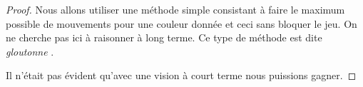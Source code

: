 \begin{proof}
	Nous allons utiliser une méthode simple consistant à faire le maximum possible de mouvements pour une couleur donnée et ceci sans bloquer le jeu. On ne cherche pas ici à raisonner à long terme. Ce type de méthode est dite \emph{\itshape \og gloutonne \fg}.

\begin{mvts}
	\medskip
	\item  {}

	\medskip
	\item  {}

	\medskip
	\item  {}

	\medskip
	\item  {}

	\medskip
	\item  {}

	\medskip
	\item  {}

	\medskip
	\item  {}

	\medskip
	\item  {}

	\medskip
	\item  {}
\end{mvts}

Il n'était pas évident qu'avec une vision à court terme nous puissions gagner.
\end{proof}